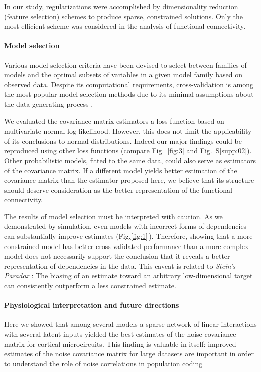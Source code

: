 \documentclass[10pt]{article}
\newcommand{\figref}[2]{Fig.\;\ref{fig:#1}\,#2}
\begin{document}
In our study, regularizations were accomplished by dimensionality reduction (feature selection) schemes to produce sparse, constrained solutions. Only the most efficient scheme was considered in the analysis of functional connectivity.

\paragraph{Model selection}
Various model selection criteria have been devised to select between families of models and the optimal subsets of variables in a given model family based on observed data. Despite its computational requirements, cross-validation is among the most popular model selection methods due to its minimal assumptions about the data generating process \cite{Arlot:2010}.

We evaluated the covariance matrix estimators a loss function based on multivariate normal log likelihood.  However, this does not limit the applicability of its conclusions to normal distributions. Indeed our major findings could be reproduced using other loss functions (compare Fig.~\ref{fig:3} and Fig.~S\ref{supp:02}).  Other probabilistic models, fitted to the same data, could also serve as estimators of the covariance matrix.  If a different model yields better estimation of the covariance matrix than the estimator proposed here, we believe that its structure should deserve consideration as the better representation of the functional connectivity.

The results of model selection must be interpreted with caution.  As we demonstrated by simulation, even models with incorrect forms of dependencies can substantially improve estimates (\figref{1}). Therefore, showing that a more constrained model has better cross-validated performance than a more complex model does not necessarily support the conclusion that it reveals a better representation of dependencies in the data.  This caveat is related to \emph{Stein's Paradox} \cite{Efron:1977}: The biasing of an estimate toward an arbitrary low-dimensional target can consistently outperform a less constrained estimate.

\paragraph{Physiological interpretation and future directions}

Here we showed that among several models a sparse network of linear interactions with several latent inputs yielded the best estimates of the noise covariance matrix for cortical microcircuits.  This finding is valuable in itself: improved estimates of the noise covariance matrix for large datasets are important in order to understand the role of noise correlations in population coding \cite{Abbott:1999, Sompolinsky:2001, Averbeck:2006, Ecker:2011}  
\end{document}
